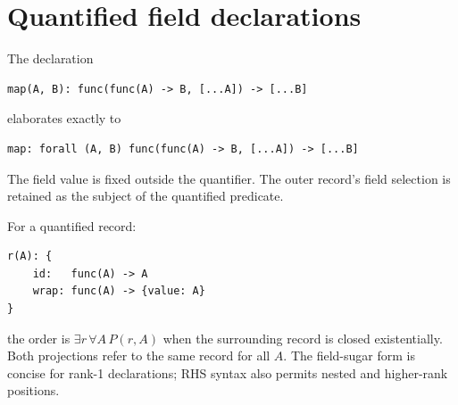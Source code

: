 \documentclass[11pt,a4paper,oneside]{report}
\theoremstyle{remark}
\begin{document}
\section{Quantified field declarations}
The declaration
\par\noindent\begin{minipage}{\linewidth}
\begin{lstlisting}
map(A, B): func(func(A) -> B, [...A]) -> [...B]
\end{lstlisting}
\end{minipage}\par
elaborates exactly to
\par\noindent\begin{minipage}{\linewidth}
\begin{lstlisting}
map: forall (A, B) func(func(A) -> B, [...A]) -> [...B]
\end{lstlisting}
\end{minipage}\par
The field value is fixed outside the quantifier. The outer record's field
selection is retained as the subject of the quantified predicate.

For a quantified record:
\par\noindent\begin{minipage}{\linewidth}
\begin{lstlisting}
r(A): {
    id:   func(A) -> A
    wrap: func(A) -> {value: A}
}
\end{lstlisting}
\end{minipage}\par
the order is $\exists r\,\forall A\,P(r,A)$ when the surrounding record is
closed existentially. Both projections refer to the same record for all $A$.
The field-sugar form is concise for rank-1 declarations; RHS syntax also permits
nested and higher-rank positions.
\end{document}
